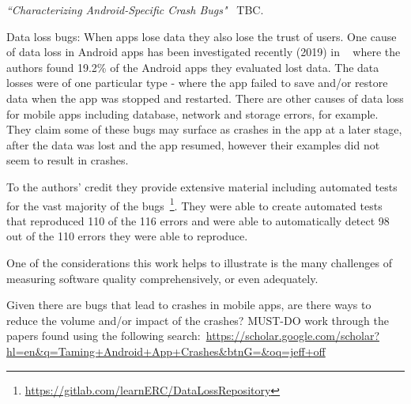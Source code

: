 
\emph{``Characterizing Android-Specific Crash Bugs"}~\citep{jha2019_characterizing_android_specific_crash_bugs} TBC.


Data loss bugs: When apps lose data they also lose the trust of users. One cause of data loss in Android apps has been investigated recently (2019) in ~\cite{riganelli2019benchmark_android_data_loss_bugs} where the authors found 19.2\% of the Android apps they evaluated lost data. The data losses were of one particular type - where the app failed to save and/or restore data when the app was stopped and restarted. There are other causes of data loss for mobile apps including database, network and storage errors, for example. They claim some of these bugs may surface as crashes in the app at a later stage, after the data was lost and the app resumed, however their examples did not seem to result in crashes.  

To the authors' credit they provide extensive material including automated tests for the vast majority of the bugs~\footnote{\url{https://gitlab.com/learnERC/DataLossRepository}}. They were able to create automated tests that reproduced 110 of the 116 errors and were able to automatically detect 98 out of the 110 errors they were able to reproduce.

One of the considerations this work helps to illustrate is the many challenges of measuring software quality comprehensively, or even adequately.

Given there are bugs that lead to crashes in mobile apps, are there ways to reduce the volume and/or impact of the crashes? MUST-DO work through the papers found using the following search:~\url{https://scholar.google.com/scholar?hl=en&q=Taming+Android+App+Crashes&btnG=&oq=jeff+off}


